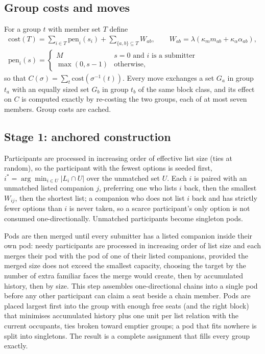 \documentclass[11pt,a4paper]{article}
\theoremstyle{plain}
\theoremstyle{definition}
\theoremstyle{remark}
\begin{document}
\subsection{Group costs and moves}
For a group $t$ with member set $T$ define
\begin{gather*}
\mathrm{cost}(T) = \sum_{i \in T} \mathrm{pen}_i(s_i) + \sum_{\{a,b\} \subseteq T} W_{ab}, \qquad W_{ab} = \lambda(\kappa_m m_{ab} + \kappa_\alpha \alpha_{ab}), \\
\mathrm{pen}_i(s) = \begin{cases} M & s = 0 \text{ and } i \text{ is a submitter} \\ \max(0, s - 1) & \text{otherwise,} \end{cases}
\end{gather*}
so that $C(\sigma) = \sum_t \mathrm{cost}(\sigma^{-1}(t))$. Every move exchanges a set $G_a$ in group $t_a$ with an equally sized set $G_b$ in group $t_b$ of the same block class, and its effect on $C$ is computed exactly by re-costing the two groups, each of at most seven members. Group costs are cached.

\subsection{Stage 1: anchored construction}
Participants are processed in increasing order of effective list size (ties at random), so the participant with the fewest options is seeded first, $i^\ast = \arg\min_{i \in U} |L_i \cap U|$ over the unmatched set $U$. Each $i$ is paired with an unmatched listed companion $j$, preferring one who lists $i$ back, then the smallest $W_{ij}$, then the shortest list; a companion who does not list $i$ back and has strictly fewer options than $i$ is never taken, so a scarce participant's only option is not consumed one-directionally. Unmatched participants become singleton pods.

Pods are then merged until every submitter has a listed companion inside their own pod: needy participants are processed in increasing order of list size and each merges their pod with the pod of one of their listed companions, provided the merged size does not exceed the smallest capacity, choosing the target by the number of extra familiar faces the merge would create, then by accumulated history, then by size. This step assembles one-directional chains into a single pod before any other participant can claim a seat beside a chain member. Pods are placed largest first into the group with enough free seats (and the right block) that minimises accumulated history plus one unit per list relation with the current occupants, ties broken toward emptier groups; a pod that fits nowhere is split into singletons. The result is a complete assignment that fills every group exactly.
\end{document}
